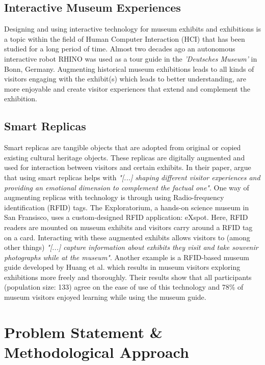 \subsection{Interactive Museum Experiences}
Designing and using interactive technology for museum exhibits and exhibitions is a topic within the field of Human Computer Interaction (HCI) that has been studied for a long period of time\cite{Capurro2015TangibleApplications,Ciolfi2007SupportingDesign,Hornecker2006,Marshall2016UsingExhibition}. Almost two decades ago an autonomous interactive robot RHINO was used as a tour guide in the \textit{'Deutsches Museum'} in Bonn,
Germany\cite{Burgard1999}. Augmenting historical museum exhibitions leads to all kinds of visitors engaging with the exhibit(s) which leads to better understanding, are more enjoyable and create visitor experiences that extend and complement the exhibition\cite{Hornecker2006,Marshall2016UsingExhibition}.

\subsection{Smart Replicas}
Smart replicas are tangible objects that are adopted from original or copied existing cultural heritage objects. These replicas are digitally augmented and used for interaction between visitors and certain exhibits. 
In their paper, \citet{Marshall2016} argue that using smart replicas helps with \textit{"[...] shaping different visitor experiences and providing an emotional dimension to complement the factual one"}\cite{Marshall2016UsingExhibition}. 
One way of augmenting replicas with technology is through using Radio-frequency identification (RFID) tags. The Exploratorium, a hands-on science museum in San Fransisco, uses a custom-designed RFID application: eXspot. Here, RFID readers are mounted on museum exhibits and visitors carry around a RFID tag on a card. Interacting with these augmented exhibits allows visitors to (among other things) \textit{"[...] capture information about exhibits they visit and take souvenir photographs while at the museum"}\cite{HsiSherryFiat2010}. Another example is a RFID-based museum guide developed by Huang et al. which results in museum visitors exploring exhibitions more freely and thoroughly. Their results show that all participants (population size: 133) agree on the ease of use of this technology and 78\% of museum visitors enjoyed learning while using the museum guide\cite{Huang2011}.

\section{Problem Statement \& Methodological Approach} \label{probmed}

